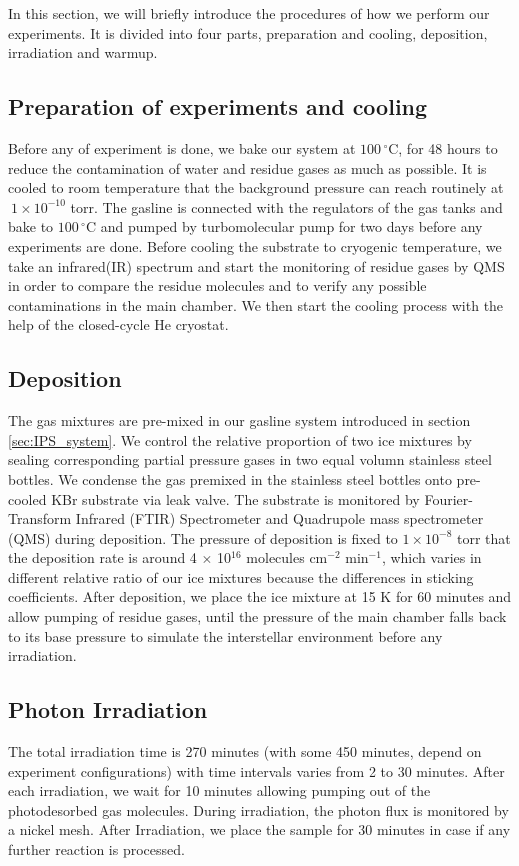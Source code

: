In this section, we will briefly introduce the  procedures of how we perform our experiments. It is divided into four parts, preparation and cooling, deposition, irradiation and warmup.

\subsection{Preparation of experiments and cooling}
Before any of experiment is done, we bake our system at $100 \,^{\circ}\mathrm{C}$, for 48 hours to reduce the contamination of water and residue gases as much as possible. It is cooled to room temperature that the background pressure can reach routinely at $~ 1 \times 10^{-10}$ torr. The gasline is connected with the regulators of the gas tanks and bake to $100\,^{\circ}\mathrm{C}$ and pumped by turbomolecular pump for two days before any experiments are done. Before cooling the substrate to cryogenic temperature, we take an infrared(IR) spectrum and start the monitoring of residue gases by QMS in order to compare the residue molecules and to verify any possible contaminations in the main chamber. We then start the cooling process with the help of the closed-cycle He cryostat.

\subsection{Deposition}
The gas mixtures are pre-mixed in our gasline system introduced in section \ref{sec:IPS_system}. We control the relative proportion of two ice mixtures by sealing corresponding partial pressure gases in two equal volumn stainless steel bottles. We condense the gas premixed in the stainless steel bottles onto pre-cooled KBr substrate via leak valve. The substrate is monitored by Fourier-Transform Infrared (FTIR) Spectrometer and Quadrupole mass spectrometer (QMS) during deposition. The pressure of deposition is fixed to $1 \times 10^{-8}$ torr that the deposition rate is around 4 $\times$ 10$^{16}$ molecules cm$^{-2}$ min$^{-1}$, which varies in different relative ratio of our ice mixtures because the differences in sticking coefficients. After deposition, we place the ice mixture at 15 K for 60 minutes and allow pumping of residue gases, until the pressure of the main chamber falls back to its base pressure to simulate the interstellar environment before any irradiation.

\subsection{Photon Irradiation}
The total irradiation time is 270 minutes (with some 450 minutes, depend on experiment configurations) with time intervals varies from 2 to 30 minutes. After each irradiation, we wait for 10 minutes allowing pumping out of the photodesorbed gas molecules. During irradiation, the photon flux is monitored by a nickel mesh. After Irradiation, we place the sample for 30 minutes in case if any further reaction is processed.

